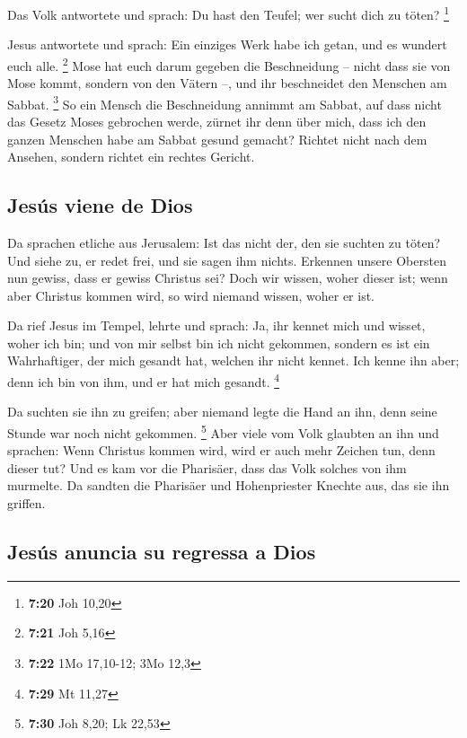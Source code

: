  Das Volk antwortete und sprach: Du hast den Teufel; wer
sucht dich zu töten? \footnote{\textbf{7:20} Joh 10,20}

 Jesus antwortete und sprach: Ein einziges Werk habe ich
getan, und es wundert euch alle. \footnote{\textbf{7:21} Joh 5,16}
 Mose hat euch darum gegeben die Beschneidung -- nicht
dass sie von Mose kommt, sondern von den Vätern --, und ihr beschneidet
den Menschen am Sabbat. \footnote{\textbf{7:22} 1Mo 17,10-12; 3Mo 12,3}
 So ein Mensch die Beschneidung annimmt am Sabbat, auf
dass nicht das Gesetz Moses gebrochen werde, zürnet ihr denn über mich,
dass ich den ganzen Menschen habe am Sabbat gesund gemacht?
 Richtet nicht nach dem Ansehen, sondern richtet ein
rechtes Gericht.

\hypertarget{jesuxfas-viene-de-dios}{%
\subsection{Jesús viene de Dios}\label{jesuxfas-viene-de-dios}}

 Da sprachen etliche aus Jerusalem: Ist das nicht der,
den sie suchten zu töten?  Und siehe zu, er redet frei,
und sie sagen ihm nichts. Erkennen unsere Obersten nun gewiss, dass er
gewiss Christus sei?  Doch wir wissen, woher dieser ist;
wenn aber Christus kommen wird, so wird niemand wissen, woher er ist.

 Da rief Jesus im Tempel, lehrte und sprach: Ja, ihr
kennet mich und wisset, woher ich bin; und von mir selbst bin ich nicht
gekommen, sondern es ist ein Wahrhaftiger, der mich gesandt hat, welchen
ihr nicht kennet.  Ich kenne ihn aber; denn ich bin von
ihm, und er hat mich gesandt. \footnote{\textbf{7:29} Mt 11,27}

 Da suchten sie ihn zu greifen; aber niemand legte die
Hand an ihn, denn seine Stunde war noch nicht gekommen. \footnote{\textbf{7:30}
  Joh 8,20; Lk 22,53}  Aber viele vom Volk glaubten an
ihn und sprachen: Wenn Christus kommen wird, wird er auch mehr Zeichen
tun, denn dieser tut?  Und es kam vor die Pharisäer, dass
das Volk solches von ihm murmelte. Da sandten die Pharisäer und
Hohenpriester Knechte aus, das sie ihn griffen.

\hypertarget{jesuxfas-anuncia-su-regressa-a-dios}{%
\subsection{Jesús anuncia su regressa a
Dios}\label{jesuxfas-anuncia-su-regressa-a-dios}}

